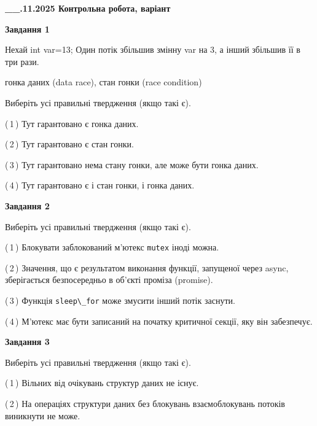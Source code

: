 \documentclass[12pt, ukrainian]{article}
\def\code#1{\Verb!#1!}
\begin{document}
\begin {large}

\textbf{\_\_.11.2025 Контрольна робота, варіант  }\par


{

\begin{center}
\textbf{Завдання 1}
\end{center}
Нехай int var=13; Один потік збільшив змінну var на 3, а інший збільшив її в три рази.

гонка даних (data race), стан гонки (race condition)

Виберіть усі правильні твердження (якщо такі є).\par
\vspace{2mm}
(\,1\,) Тут гарантовано є гонка даних.%

(\,2\,) Тут гарантовано є стан гонки.%

(\,3\,) Тут гарантовано нема стану гонки, але може бути гонка даних.%

(\,4\,) Тут гарантовано є і стан гонки, і гонка даних.%



\begin{center}
\textbf{Завдання 2}
\end{center}
Виберіть усі правильні твердження (якщо такі є).\par
\vspace{2mm}

(\,1\,) Блокувати заблокований м’ютекс  \code{mutex} іноді можна.%

(\,2\,) Значення, що є результатом виконання функції, запущеної через async, зберігається безпосередньо в об’єкті проміза (promise).%

(\,3\,) Функція \code{sleep\_for} може змусити інший потік заснути.%

(\,4\,) М’ютекс має бути записаний на початку критичної секції, яку він забезпечує.%



\begin{center}
\textbf{Завдання 3}
\end{center}
Виберіть усі правильні твердження (якщо такі є).\par
\vspace{2mm}

(\,1\,) Вільних від очікувань структур даних не існує.%

(\,2\,) На операціях структури даних без блокувань взаємоблокувань потоків виникнути не може.%

}
\end{large}
\end{document}
